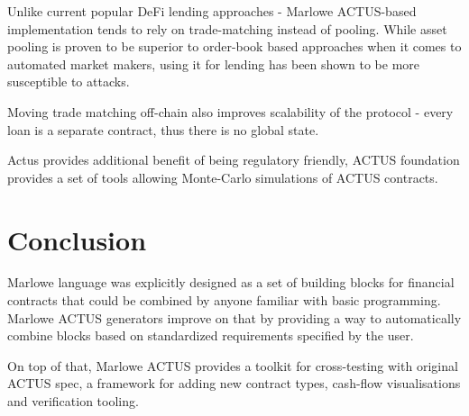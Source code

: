 \documentclass[runningheads]{llncs}
\begin{document}


Unlike current popular DeFi lending approaches - Marlowe ACTUS-based
implementation tends to rely on trade-matching instead of pooling.
While asset pooling is proven to be superior to order-book based approaches
when it comes to automated market makers, using it for lending has
been shown to be more susceptible to attacks\cite{flash-loan}.

Moving trade matching off-chain also improves scalability of the protocol
- every loan is a separate contract, thus there is no global state.

Actus provides additional benefit of being regulatory friendly, ACTUS
foundation provides a set of tools allowing Monte-Carlo simulations
of ACTUS contracts.

\section{Conclusion}
\label{conclusion}

Marlowe language was explicitly designed as a set of building blocks
for financial contracts that could be combined by anyone familiar
with basic programming. Marlowe ACTUS generators improve on that by
providing a way to automatically combine blocks based on standardized
requirements specified by the user.

On top of that, Marlowe ACTUS provides a toolkit for cross-testing
with original ACTUS spec, a framework for adding new contract types,
cash-flow visualisations and verification tooling.

%
%
%


%
\end{document}
